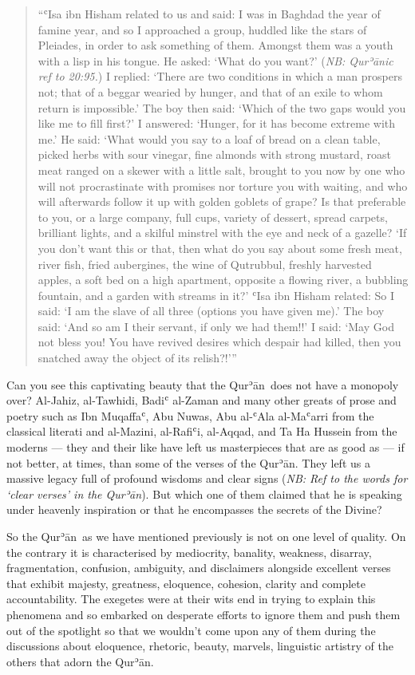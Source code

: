 \documentclass[12pt]{memoir}
\def\´{ʾ} %
\def\`{ʿ} %
\def \Quran{Qur\-\´ān} %
\newcommand{\QRef}[1]{{\color{darkblue}#1}}
\newcommand{\NB}[1]{\emph{\small NB: #1}}
\begin{document}
\begin{quote}
“\`Isa ibn Hisham related to us and said: I was in Baghdad the year of
famine year, and so I approached a group,
huddled like the stars of Pleiades, in order to ask something of them.
Amongst them was a youth with a lisp in his tongue.
He asked: ‘What do you want?’
(\NB{\Quran{}ic ref to \QRef{20:95}.})
I replied: ‘There are two conditions in which a man prospers not;
that of a beggar wearied by hunger,
and that of an exile to whom return is impossible.’
The boy then said: ‘Which of the two gaps would you like me to fill first?’
I answered: ‘Hunger, for it has become extreme with me.’
He said: ‘What would you say to a loaf of bread on a clean table,
picked herbs with sour vinegar, fine almonds with strong mustard,
roast meat ranged on a skewer with a little salt,
brought to you now by one who will not procrastinate with promises
nor torture you with waiting, and who will afterwards follow it up
with golden goblets of grape? Is that preferable to you, or a large company,
full cups, variety of dessert, spread carpets, brilliant lights,
and a skilful minstrel with the eye and neck of a gazelle?
‘If you don’t want this or that, then what do you say about some fresh meat,
river fish, fried aubergines, the wine of Qutrubbul,
freshly harvested apples, a soft bed on a high apartment,
opposite a flowing river, a bubbling fountain,
and a garden with streams in it?’
\`Isa ibn Hisham related: So I said: ‘I am the slave of all three
(options you have given me).’
The boy said: ‘And so am I their servant, if only we had them!!’
I said: ‘May God not bless you! You have revived desires which
despair had killed, then you snatched away the object of its relish?!’”
\end{quote}

Can you see this captivating beauty that
the \Quran\ does not have a monopoly over?
Al-Jahiz, al-Tawhidi, Badi\` al-Zaman and many other greats of prose and poetry
such as Ibn Muqaffa\`, Abu Nuwas, Abu al-\`Ala al-Ma\`arri
from the classical literati and al-Mazini, al-Rafi\`i, al-Aqqad,
and Ta Ha Hussein from the moderns —
they and their like have left us masterpieces that are as good as —
if not better, at times, than some of the verses of the \Quran.
They left us a massive legacy full of profound wisdoms and clear signs
(\NB{Ref to the words for ‘clear verses’ in the \Quran}).
But which one of them claimed that he is speaking under heavenly inspiration
or that he encompasses the secrets of the Divine?

So the \Quran\ as we have mentioned previously is not on one level of quality.
On the contrary it is characterised by mediocrity, banality, weakness,
disarray, fragmentation, confusion, ambiguity,
and disclaimers alongside excellent verses that exhibit
majesty, greatness, eloquence, cohesion, clarity and complete accountability.
The exegetes were at their wits end in trying to explain this phenomena
and so embarked on desperate efforts to ignore them and push them out of
the spotlight so that we wouldn’t come upon any of them during
the discussions about eloquence, rhetoric, beauty, marvels, linguistic
artistry of the others that adorn the \Quran.
\end{document}
